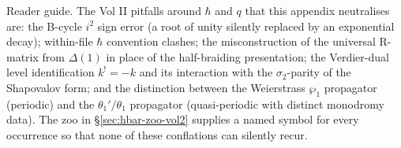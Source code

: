 \begin{remark}
Reader guide. The Vol II pitfalls around $\hbar$ and $q$ that this appendix
neutralises are: the B-cycle $i^{2}$ sign error (a root of unity silently
replaced by an exponential decay); within-file $\hbar$ convention clashes; the
misconstruction of the universal R-matrix from $\Delta(1)$ in place of the
half-braiding presentation; the Verdier-dual level identification $k^{!} = -k$
and its interaction with the $\sigma_{2}$-parity of the Shapovalov form; and
the distinction between the Weierstrass $\wp_{1}$ propagator (periodic) and the
$\theta_{1}'/\theta_{1}$ propagator (quasi-periodic with distinct monodromy
data). The zoo in \S\ref{sec:hbar-zoo-vol2} supplies a named symbol for every
occurrence so that none of these conflations can silently recur.
\end{remark}
